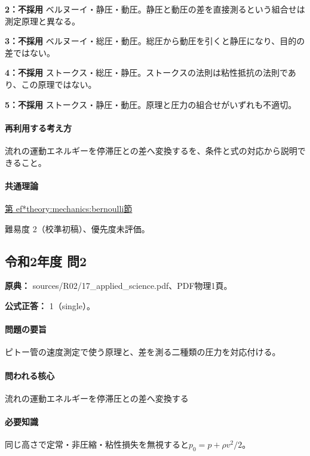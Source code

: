 \noindent\textbf{2：不採用} ベルヌーイ・静圧・動圧。静圧と動圧の差を直接測るという組合せは測定原理と異なる。\par

\noindent\textbf{3：不採用} ベルヌーイ・総圧・動圧。総圧から動圧を引くと静圧になり、目的の差ではない。\par

\noindent\textbf{4：不採用} ストークス・総圧・静圧。ストークスの法則は粘性抵抗の法則であり、この原理ではない。\par

\noindent\textbf{5：不採用} ストークス・静圧・動圧。原理と圧力の組合せがいずれも不適切。\par

\paragraph{再利用する考え方} 流れの運動エネルギーを停滞圧との差へ変換するを、条件と式の対応から説明できること。

\paragraph{共通理論} \hyperref[theory:mechanics:bernoulli]{第
ef*{theory:mechanics:bernoulli}節}

\par 難易度 2（校準初稿）、優先度未評価。

\subsection{令和2年度 問2}
\label{q:r02-reg-applied-02}

\noindent\textbf{原典：} sources/R02/17\_applied\_science.pdf、PDF物理1頁。

\textbf{公式正答：} 1（single）。

\paragraph{問題の要旨} ピトー管の速度測定で使う原理と、差を測る二種類の圧力を対応付ける。

\paragraph{問われる核心} 流れの運動エネルギーを停滞圧との差へ変換する

\paragraph{必要知識} 同じ高さで定常・非圧縮・粘性損失を無視すると\(p_0=p+\rho v^2/2\)。

